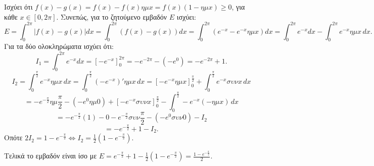 \begin{alist}
\item [γ)] Ισχύει ότι $f(x)-g(x)=f(x)-f(x)\eta\mu x=f(x)(1-\eta\mu x)\ge 0$, για κάθε $x \in [0,2\pi]$.
Συνεπώς, για το ζητούμενο εμβαδόν $E$ ισχύει:
\[ E=\int_{0}^{2\pi}\left|f(x)-g(x)\right|dx=\int_{0}^{2\pi}(f(x)-g(x))dx=\int_{0}^{2\pi}(e^{-x}-e^{-x}\eta\mu x)dx=\int_{0}^{2\pi}e^{-x}dx-\int_{0}^{2\pi}e^{-x}\eta\mu x\,dx. \]
Για τα δύο ολοκληρώματα ισχύει ότι:
\[I_1=\int_{0}^{2\pi}e^{-x}dx=\left[-e^{-x}\right]_{0}^{2\pi}=-e^{-2\pi}-(-e^0)=-e^{-2\pi}+1.\]
\[I_2=\int_{0}^{\frac{\pi}{2}}e^{-x}\eta\mu x\,dx=\int_{0}^{\frac{\pi}{2}}(-e^{-x})'\eta\mu x\,dx=\left[-e^{-x}\eta\mu x\right]_{0}^{\frac{\pi}{2}}+\int_{0}^{\frac{\pi}{2}}e^{-x}\sigma\upsilon\nu x\,dx\]
\[=-e^{-\frac{\pi}{2}}\eta\mu\frac{\pi}{2}-(-e^0\eta\mu 0)+\left[-e^{-x}\sigma\upsilon\nu x\right]_{0}^{\frac{\pi}{2}}-\int_{0}^{\frac{\pi}{2}}-e^{-x}(-\eta\mu x)\,dx\]
\[=-e^{-\frac{\pi}{2}}(1)-0-e^{-\frac{\pi}{2}}\sigma\upsilon\nu\frac{\pi}{2}-(-e^0\sigma\upsilon\nu 0)-I_2\]
\[=-e^{-\frac{\pi}{2}}+1-I_2.\]
Οπότε $2I_2=1-e^{-\frac{\pi}{2}} \Leftrightarrow I_2=\frac{1}{2}\left(1-e^{-\frac{\pi}{2}}\right)$.

Τελικά το εμβαδόν είναι ίσο με $E=e^{-\frac{\pi}{2}}+1-\frac{1}{2}\left(1-e^{-\frac{\pi}{2}}\right)=\frac{1-e^{-\frac{\pi}{2}}}{2}$.
\end{alist}